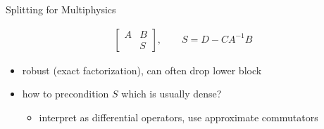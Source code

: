\begin{frame}{Splitting for Multiphysics}
\begin{itemize}
\begin{align*}
      \begin{bmatrix}
        A & B \\ & S
      \end{bmatrix}, \qquad
      S = D - C A^{-1} B
    \end{align*}
    \begin{itemize}
    \item robust (exact factorization), can often drop lower block
    \item how to precondition $S$ which is usually dense?
      \begin{itemize}
      \item interpret as differential operators, use approximate commutators
      \end{itemize}
    \end{itemize}
  \end{itemize}
\end{frame}

